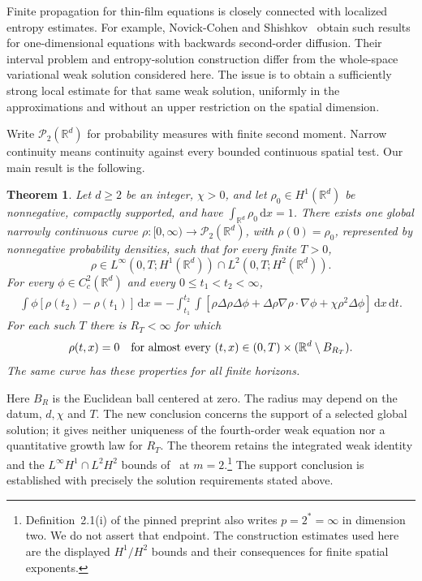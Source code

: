 \documentclass[11pt]{article}
\numberwithin{equation}{section}
\newtheorem{theorem}{Theorem}[section]
\theoremstyle{definition}
\theoremstyle{remark}
\newcommand{\R}{\mathbb R}
\newcommand{\Ptwo}{\mathcal P_2(\R^d)}
\newcommand{\dd}{\,\mathrm d}
\begin{document}
Finite propagation for thin-film equations is closely connected with
localized entropy estimates. For example, Novick-Cohen and
Shishkov~\cite{NCS} obtain such results for one-dimensional equations with
backwards second-order diffusion. Their interval problem and entropy-solution
construction differ from the whole-space variational weak solution considered
here. The issue is to obtain a sufficiently strong local estimate for that
same weak solution, uniformly in the approximations and without an
upper restriction on the spatial dimension.

Write $\Ptwo$ for probability measures with finite second moment.
Narrow continuity means continuity against every bounded continuous
spatial test. Our main result is the following.

\begin{theorem}\label{thm:main}
Let $d\ge2$ be an integer, $\chi>0$, and let
$\rho_0\in H^1(\R^d)$ be nonnegative, compactly supported, and have
$\int_{\R^d}\rho_0\dd x=1$.
There exists one global narrowly continuous curve
$\rho:[0,\infty)\to\Ptwo$, with $\rho(0)=\rho_0$, represented by
nonnegative probability densities, such that for every finite $T>0$,
\[
 \rho\in L^\infty(0,T;H^1(\R^d))\cap L^2(0,T;H^2(\R^d)).
\]
For every $\phi\in C_c^2(\R^d)$ and every $0\le t_1<t_2<\infty$,
\begin{align}\label{eq:weak}
 \int\phi[\rho(t_2)-\rho(t_1)]\dd x
  =-\int_{t_1}^{t_2}\!\int
   [\rho\Delta\rho\Delta\phi
       +\Delta\rho\nabla\rho\cdot\nabla\phi
                      +\chi\rho^2\Delta\phi]\dd x\dd t.
\end{align}
For each such $T$ there is $R_T<\infty$ for which
\[
 \rho(t,x)=0\quad\hbox{for almost every }
 (t,x)\in(0,T)\times(\R^d\setminus B_{R_T}).
\]
The same curve has these properties for all finite horizons.
\end{theorem}

Here $B_R$ is the Euclidean ball centered at zero. The radius may depend
on the datum, $d,\chi$ and $T$. The new conclusion concerns the support
of a selected global solution; it gives neither uniqueness of the
fourth-order weak equation nor a quantitative growth law for $R_T$.
The theorem retains the integrated weak identity and the
$L^\infty H^1\cap L^2H^2$ bounds of~\cite[Definition~2.1]{CEFF}
at $m=2$.\footnote{Definition~2.1(i) of the pinned preprint also writes
$p=2^*=\infty$ in dimension two. We do not assert that endpoint.
The construction estimates used here are the displayed $H^1/H^2$ bounds
and their consequences for finite spatial exponents.}
The support conclusion is established with precisely the solution
requirements stated above.
\end{document}
